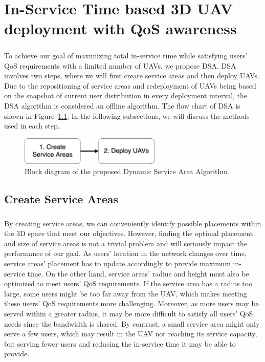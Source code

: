 \documentclass[a4paper,12pt]{report}
\begin{document}
\chapter{In-Service Time based 3D UAV deployment with QoS awareness}
\paragraph{}
To achieve our goal of maximizing total in-service time while satisfying users' QoS requirements with a limited number of UAVs, we propose DSA. DSA involves two steps, where we will first create service areas and then deploy UAVs. Due to the repositioning of service areas and redeployment of UAVs being based on the snapshot of current user distribution in every deployment interval, the DSA algorithm is considered an offline algorithm. The flow chart of DSA is shown in Figure~\ref{fig:DSA Block Diagram}. In the following subsections, we will discuss the methods used in each step.

\begin{figure} [ht]
    \centering
    \includegraphics[width=0.6\textwidth]{Figure 3.png}
    \caption{Block diagram of the proposed Dynamic Service Area Algorithm.}
    \label{fig:DSA Block Diagram}
\end{figure}


\section{Create Service Areas}
\paragraph{}
By creating service areas, we can conveniently identify possible placements within the 3D space that meet our objectives. However, finding the optimal placement and size of service areas is not a trivial problem and will seriously impact the performance of our goal. As users' location in the network changes over time, service areas' placement has to update accordingly to provide maximum in-service time. On the other hand, service areas' radius and height must also be optimized to meet users' QoS requirements. If the service area has a radius too large, some users might be too far away from the UAV, which makes meeting these users' QoS requirements more challenging. Moreover, as more users may be served within a greater radius, it may be more difficult to satisfy all users' QoS needs since the bandwidth is shared. By contrast, a small service area might only serve a few users, which may result in the UAV not reaching its service capacity, but serving fewer users and reducing the in-service time it may be able to provide.
\end{document}
